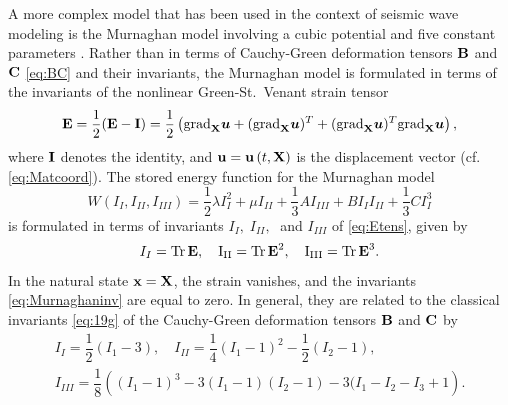 \documentclass[11pt,letter,subeqn,fleqn]{article}
\numberwithin{equation}{section}
\numberwithin{table}{section}
\numberwithin{figure}{section}
\def\barr{\begin{array}{ll}}
\def\earr{\end{array}}
\def\vec#1{{\boldsymbol{\rm #1}}} %
\def\tens#1{{\boldsymbol{\rm #1}}} %
\def\vec#1{{\boldsymbol{\rm #1}}} %
\def\tens#1{{\boldsymbol{\rm #1}}} %
\begin{document}
%
%
%

A more complex model that has been used in the context of seismic wave modeling is the Murnaghan model involving a cubic potential and five constant parameters \cite{murnaghan1951finite, rushchitsky2014nonlinear, rushchitsky2013two}. Rather than in terms of
Cauchy-Green deformation tensors $\tens{B}$ and $\vec{C}$ \eqref{eq:BC} and their invariants, the Murnaghan model is formulated in terms of the invariants of the nonlinear  Green-St.~Venant strain tensor
\begin{equation}\label{eq:Etens}
\vec{E}= \frac{1}{2}(\vec{E}-\vec{I}) = \frac{1}{2}\left(
\mathrm{grad}_{\vec{X}}\boldsymbol{u} + (\mathrm{grad}_{\vec{X}}\boldsymbol{u})^T
+(\mathrm{grad}_{\vec{X}}\boldsymbol{u})^T \mathrm{grad}_{\vec{X}}\boldsymbol{u} \right),
\end{equation}
where $\vec{I}$ denotes the identity, and $\vec{u}=\vec{u}\left(t,\vec{X}\right)$ is the displacement vector (cf. \eqref{eq:Matcoord}). The stored energy function for the Murnaghan model
\begin{equation}\label{eq:Murnaghan1}
W(I_{I},I_{II}, I_{III})= \frac{1}{2}\lambda I^{2}_{I}+\mu I_{II}+\frac{1}{3}A I_{III}+B I_{I}I_{II}+\frac{1}{3}CI^{3}_{I}
\end{equation}
is formulated in terms of invariants $I_{I},\;I_{II},\;$ and $I_{III}$ of \eqref{eq:Etens}, given by
\begin{equation}\label{eq:Murnaghaninv}
I_{I}=\rm{Tr}\,\vec{E},\quad I_{II}=\rm{Tr}\,\vec{E}^2,\quad I_{III}=\rm{Tr}\,\vec{E}^3.
\end{equation}
In the natural state $\vec{x}=\vec{X}$, the strain vanishes, and the invariants \eqref{eq:Murnaghaninv} are equal to zero. In general, they are  related to the classical invariants \eqref{eq:19g} of the Cauchy-Green deformation tensors $\tens{B}$ and $\vec{C}$ by
\begin{equation}\label{eq:Murnaghaninv:classic}
\barr
I_{I}=\dfrac{1}{2}(I_1-3), \quad I_{II}=\dfrac{1}{4}(I_1-1)^2-\dfrac{1}{2}(I_2-1),\\[2ex]
I_{III}=\dfrac{1}{8}\left( (I_1-1)^3-3(I_1-1)(I_2-1)-3(I_1-I_2-I_3+1\right).
\earr
\end{equation}
\end{document}
